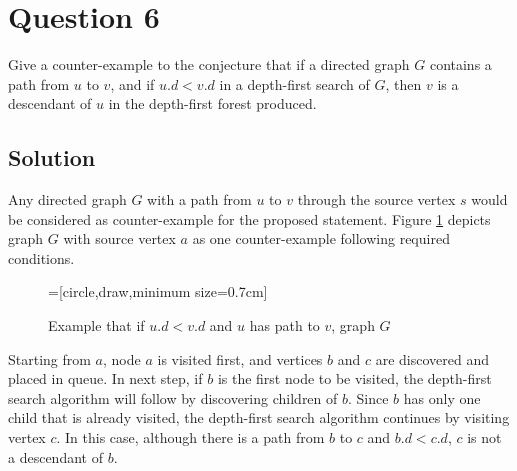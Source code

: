 
\section*{Question 6}

Give a counter-example to the conjecture that if a directed graph $G$ contains a path from $u$ to $v$, and if $u.d < v.d$ in a depth-first search of $G$, then $v$ is a descendant of $u$ in the depth-first forest produced.

\subsection*{Solution}

Any directed graph $G$ with a path from $u$ to $v$ through the source vertex $s$ would be considered as counter-example for the proposed statement.
Figure \ref{fig61} depicts graph $G$ with source vertex $a$ as one counter-example following required conditions.

\begin{figure}[H]\centering
{}=[circle,draw,minimum size=0.7cm]
\caption{Example that if $u.d < v.d$ and $u$ has path to $v$,  graph $G$}\label{fig61}
\end{figure}

Starting from $a$, node $a$ is visited first, and vertices $b$ and $c$ are discovered and placed in queue.
In next step, if $b$ is the first node to be visited, the depth-first search algorithm will follow by discovering children of $b$.
Since $b$ has only one child that is already visited, the depth-first search algorithm continues by visiting vertex $c$.
In this case, although there is a path from $b$ to $c$ and $b.d < c.d$, $c$ is not a descendant of $b$.
